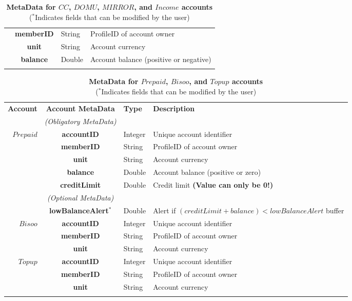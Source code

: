 \begin{table}[H]
\begin{centering}
{\begin{tabular}{ r | c | l | l }
			& {\bf memberID}			&String	& ProfileID of account owner \\
			& {\bf unit}					&String	& Account currency \\
			& {\bf balance}				&Double	& Account balance (positive or negative) \\
\Xhline{1.5pt}
\end{tabular}
}
\caption{\small\textbf{MetaData for $CC$, $DOMU$, $MIRROR$, and $Income$ accounts}\\
($^*$Indicates fields that can be modified by the user)}
\label{tab:AccountMetaData1}
\end{centering}
\end{table}

\begin{table}[H]
\begin{centering}
\small
{
\begin{tabular}{ r | c | l | l }
\hline
\textbf{Account}	& {\bf Account MetaData} & {\bf Type} & {\bf Description} \\
\Xhline{1.5pt}
			 & \emph{(Obligatory MetaData)}& & \\
\cline{2-2}
$Prepaid$ 	& {\bf accountID}			&Integer	& Unique account identifier \\
			& {\bf memberID}			&String	& ProfileID of account owner \\
			& {\bf unit}					&String	& Account currency \\
			& {\bf balance}				&Double	& Account balance (positive or zero) \\
			& {\bf creditLimit}			&Double	& Credit limit {\bf (Value can only be 0!)} \\
\cline{2-2}
			 & \emph{(Optional MetaData)}& & \\
\cline{2-2}
			& {\bf lowBalanceAlert$^*$}		&Double	& Alert if $(creditLimit + balance) < lowBalanceAlert$ buffer \\
\Xhline{1.5pt}
$Bisoo$ 		& {\bf accountID}			&Integer	& Unique account identifier \\
			& {\bf memberID}			&String	& ProfileID of account owner \\
			& {\bf unit}					&String	& Account currency \\
\Xhline{1.5pt}
$Topup$ 		& {\bf accountID}			&Integer	& Unique account identifier \\
			& {\bf memberID}			&String	& ProfileID of account owner \\
			& {\bf unit}					&String	& Account currency \\
\Xhline{1.5pt}
\end{tabular}
}
\caption{\small\textbf{MetaData for $Prepaid$, $Bisoo$, and $Topup$ accounts}\\
($^*$Indicates fields that can be modified by the user)}
\label{tab:AccountMetaData2}
\end{centering}
\end{table}

